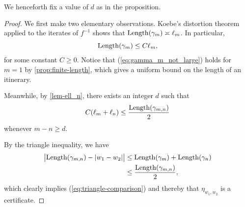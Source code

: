 We henceforth fix a value of $d$ as in the proposition.
\begin{proof} 
We first make two elementary observations. %
Koebe's distortion theorem applied to the iterates of $f^{-1}$ shows that $\operatorname{Length}(\gamma_m) \asymp \ell_m$. In particular,
\begin{equation} \label{eq:gamma_m_not_large}
		\operatorname{Length}(\gamma_m) \leq C \ell_m,
	\end{equation}
for some constant $C \geq 0$. 
Notice that (\ref{eq:gamma_m_not_large}) holds for $m=1$ by \cref{prop:finite-length}, which gives a uniform bound on the length of an itinerary.

Meanwhile, by \cref{lem-ell_n}, there exists an integer $d$ such that
\begin{align}
C(\ell_m + \ell _n) \leq \frac{\operatorname{Length}(\gamma_{m,n})}{2}
\end{align}
whenever $m-n \geq d$.

By the triangle inequality, we have
\begin{align*} 
		\bigl | \operatorname{Length}(\gamma_{m,n}) - |w_1-w_2| \bigr | & \le \operatorname{Length}(\gamma_m)+\operatorname{Length}(\gamma_n) \\
		& \le \frac{\operatorname{Length}(\gamma_{m,n})}{2},
\end{align*}
which clearly implies (\ref{eq:triangle-comparison}) and thereby that $\eta_{w_1,w_2}$ is a certificate.
\end{proof}

\bigskip

\begin{figure}
    \centering
{}
  \label{fig:proof-triangle-ineq}
\end{figure}


